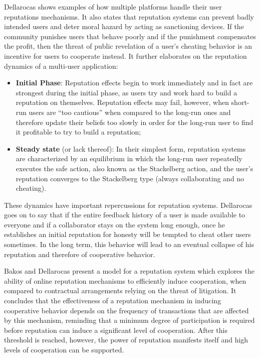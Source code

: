 Dellarocas \cite{Dellarocas2005-rep-mech} shows examples of how multiple platforms handle their user reputations mechanisms. It also states that reputation systems can prevent badly intended users and deter moral hazard by acting as sanctioning devices. If the community punishes users that behave poorly and if the punishment compensates the  profit, then the threat of public revelation of a user's cheating behavior is an incentive for users to cooperate instead. It further elaborates on the reputation dynamics of a multi-user application: 
\begin{itemize}
    \item \textbf{Initial Phase}: Reputation effects begin to work immediately and in fact are strongest during the initial phase, as users try and work hard to build a reputation on themselves. Reputation effects may fail, however, when short-run users are “too cautious” when compared to the long-run ones and therefore update their beliefs too slowly in order for the long-run user to find it profitable to try to build a reputation;
    \item \textbf{Steady state} (or lack thereof): In their simplest form, reputation systems are characterized by an equilibrium in which the long-run user repeatedly executes the safe action, also known as the Stackelberg action, and the user's reputation converges to the Stackelberg type (always collaborating and no cheating).
\end{itemize}

These dynamics have important repercussions for reputation systems. Dellarocas goes on to say that if the entire feedback history of a user is made available to everyone and if a collaborator stays on the system long enough, once he establishes an initial reputation for honesty will be tempted to cheat other users sometimes. In the long term, this behavior will lead to an eventual collapse of his reputation and therefore of cooperative behavior.

Bakos and Dellarocas \cite{Bakos2003} present a model for a reputation system which explores the ability of online reputation mechanisms to efficiently induce cooperation, when compared to contractual arrangements relying on the threat of litigation. It concludes that the effectiveness of a reputation mechanism in inducing cooperative behavior depends on the frequency of transactions that are affected by this mechanism, reminding that a minimum degree of participation is required before reputation can induce a significant level of cooperation. After this threshold is reached, however, the power of reputation manifests itself and high levels of cooperation can be supported.

